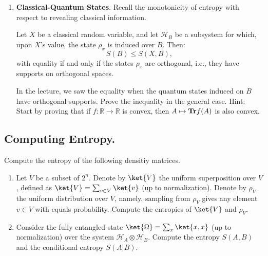 \documentclass[12pt,a4paper]{article}
\begin{document}
\begin{enumerate}
    


  \item \textbf{Classical-Quantum States}. Recall the monotonicity of entropy with respect to revealing classical information.
     \begin{claim}
Let $X$ be a classical random variable, and let $\mathcal{H}_B$ be a subsystem for which, upon $X$'s value, the state $\rho_{x}$ is induced over $B$. Then: 
       \[ S(B) \leq S(X,B), \]    
    with equality if and only if the states $\rho_x$ are orthogonal, i.e., they have supports on orthogonal spaces.\end{claim}
In the lecture, we saw the equality when the quantum states induced on $B$ have orthogonal supports. Prove the inequality in the general case. Hint: Start by proving that if $f : \mathbb{R} \rightarrow \mathbb{R}$ is convex, then $A \mapsto \mathbf{Tr} f(A)$ is also convex.

\end{enumerate}

    

\subsection{Computing Entropy.}
Compute the entropy of the following densitiy matrices. 
\begin{enumerate}

  \item Let $V$ be a subset of $2^{n}$. Denote by $\ket{V}$ the uniform superposition over $V$, defined as $\ket{V} = \sum_{v \in V}{\ket{v}}$ (up to normalization). Denote by $\rho_{V}$ the uniform distribution over $V$, namely, sampling from $\rho_{V}$ gives any element $v \in V$ with equals probability. Compute the entropies of $\ket{V}$ and $\rho_{V}$.
    

  \item  Consider the fully entangled state $\ket{\Omega} = \sum_{x}{\ket{x,x}}$ (up to normalization) over the system $\mathcal{H}_{A} \otimes \mathcal{H}_{B}$. Compute the entropy $S(A,B)$ and the conditional entropy $S(A|B)$.
  

\end{enumerate}
\end{document}
